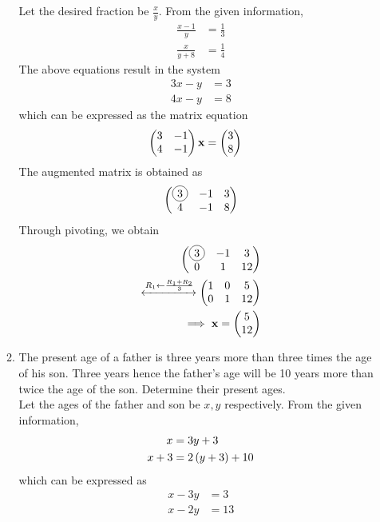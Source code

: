 \documentclass[journal,12pt,twocolumn]{IEEEtran}
\begin{document}
\begin{enumerate}[label=4.\arabic*]
\begin{enumerate}
		\solution Let the desired fraction be $\frac{x}{y}$.  From the given information, 
		    \begin{align}
			    \frac{x-1}{y} &= \frac{1}{3}
			    \\
			    \frac{x}{y+8} &= \frac{1}{4}
		    \end{align}
		    The above equations result in the system 
		    \begin{align}
			    3x - y &= 3
			    \\
			    4x - y &= 8 
		    \end{align}
		    which can be expressed as the matrix equation 
		    \begin{align}
			    \begin{pmatrix}	    3 & -1  
			    \\
			    4 & -1\end{pmatrix} \mathbf{x} &= \begin{pmatrix}3\\8 \end{pmatrix}
		    \end{align}
		    The augmented matrix is obtained as 
		    \begin{align}
			    \myvec{	    \circled{3} & -1  &3
			    \\
			    4 & -1 & 8}  
		    \end{align}
		    Through pivoting, we obtain 
		    \begin{align}
			    \myvec{	    \circled{3} & -1  &3
			    \\
			    0 & 1 & 12}  
			    \\
			    \xleftrightarrow[]{R_1 \leftarrow \frac{R_1 + R_2}{3}}
			    \myvec{	    1 & 0  & 5
			    \\
			    0 & 1 & 12}  
			    \\
			    \implies \vec{x} = \myvec{5\\12}
		    \end{align}
        \item The present age of a father is three years more than three times the age of his son. Three years hence the father's age will be 10 years more than twice the age of the son. Determine their present ages.\\
		\solution Let the ages of the father and son be $x, y$ respectively.  From the given information, 
		    \begin{align}
			    x &= 3y+3
			    \\
			    x+3 &= 2\left(y+3\right) + 10
		    \end{align}
		    which can be expressed as 
		    \begin{align}
			    x  -3y &= 3
			    \\
			    x -2y  &= 13
			    \\

\end{align}
\end{enumerate}
\end{enumerate}
\end{document}
